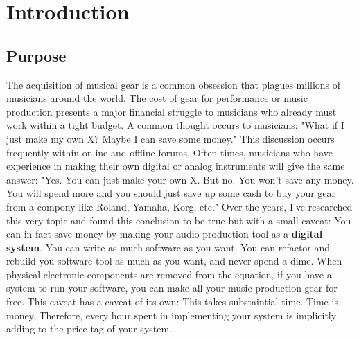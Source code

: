 \documentclass[acmlarge,screen]{acmart}
\begin{document}

\maketitle

\section{Introduction}
\subsection{Purpose}
	The acquisition of musical gear is a common obsession that plagues millions of musicians around the world. The cost of gear for performance or music production presents a major financial struggle to musicians who already must work within a tight budget. A common thought occurs to musicians: "What if I just make my own X? Maybe I can save some money." This discussion occurs frequently within online and offline forums. Often times, musicians who have experience in making their own digital or analog instruments will give the same answer: "Yes. You can just make your own X. But no. You won't save any money. You will spend more and you should just save up some cash to buy your gear from a compony like Roland, Yamaha, Korg, etc." Over the years, I've researched this very topic and found this conclusion to be true but with a small caveat: You can in fact save money by making your audio production tool as a \textbf{digital system}. You can write as much software as you want. You can refactor and rebuild you software tool as much as you want, and never spend a dime. When physical electronic components are removed from the equation, if you have a system to run your software, you can make all your music production gear for free. This caveat has a caveat of its own: This takes substaintial time. Time is money. Therefore, every hour spent in implementing your system is implicitly adding to the price tag of your system.
	
\end{document}
